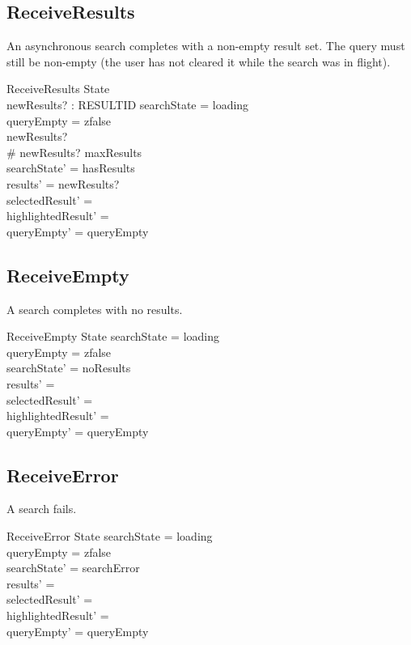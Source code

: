 \documentclass[a4paper,10pt,fleqn]{article}
\begin{document}
\subsection{ReceiveResults}

An asynchronous search completes with a non-empty result set. The query
must still be non-empty (the user has not cleared it while the search was
in flight).

\begin{schema}{ReceiveResults}
  \Delta State \\
  newResults? : \finset RESULTID
  \where
  searchState = loading \\
  queryEmpty = zfalse \\
  newResults? \neq \emptyset \\
  \# newResults? \leq maxResults \\
  searchState' = hasResults \\
  results' = newResults? \\
  selectedResult' = \emptyset \\
  highlightedResult' = \emptyset \\
  queryEmpty' = queryEmpty
\end{schema}

\subsection{ReceiveEmpty}

A search completes with no results.

\begin{schema}{ReceiveEmpty}
  \Delta State
  \where
  searchState = loading \\
  queryEmpty = zfalse \\
  searchState' = noResults \\
  results' = \emptyset \\
  selectedResult' = \emptyset \\
  highlightedResult' = \emptyset \\
  queryEmpty' = queryEmpty
\end{schema}

\subsection{ReceiveError}

A search fails.

\begin{schema}{ReceiveError}
  \Delta State
  \where
  searchState = loading \\
  queryEmpty = zfalse \\
  searchState' = searchError \\
  results' = \emptyset \\
  selectedResult' = \emptyset \\
  highlightedResult' = \emptyset \\
  queryEmpty' = queryEmpty
\end{schema}
\end{document}
